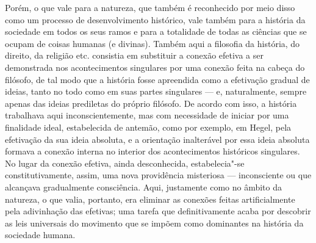 Porém, o que vale para a natureza, que também é reconhecido por meio
disso como um processo de desenvolvimento histórico, vale também para a
história da sociedade em todos os seus ramos e para a totalidade de
todas as ciências que se ocupam de coisas humanas (e divinas). Também
aqui a filosofia da história, do direito, da religião etc. consistia em
substituir a conexão efetiva a ser demonstrada nos acontecimentos
singulares por uma conexão feita na cabeça do 
filósofo, de tal modo que a história fosse apreendida como a efetivação gradual de ideias, tanto no todo
como em suas partes singulares --- e, naturalmente,
sempre apenas das ideias prediletas do próprio
filósofo. De acordo com isso, a história trabalhava aqui
inconscientemente, mas com necessidade de iniciar por uma finalidade
ideal, estabelecida de antemão, como por exemplo,
em Hegel,
pela efetivação da sua ideia absoluta, e a orientação inalterável por
essa ideia absoluta formava a conexão interna no interior dos
acontecimentos históricos singulares. No lugar da conexão efetiva, ainda
desconhecida, estabelecia"-se constitutivamente, assim,
uma nova providência misteriosa --- inconsciente ou que alcançava gradualmente consciência.
Aqui, justamente como no âmbito da natureza, o
que valia, portanto, era eliminar as conexões feitas artificialmente
pela adivinhação  das efetivas; uma tarefa que
definitivamente acaba por descobrir as leis universais do movimento que
se impõem como dominantes na história da sociedade humana.


